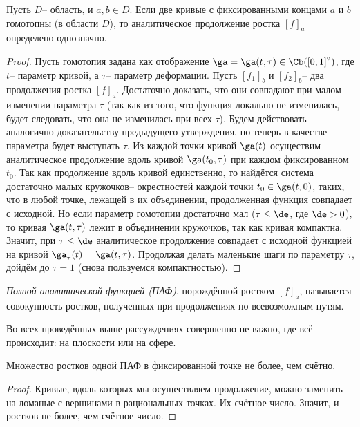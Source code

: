 \documentclass[a4paper]{article}
\begin{document}
\begin{theorem}[о монодромии]
Пусть $D$-- область, и $a,b\in D$. Если две кривые с фиксированными концами $a$ и $b$ гомотопны (в области $D$),
то аналитическое продолжение ростка $[f]_a$ определено однозначно.
\end{theorem}
\begin{proof}
Пусть гомотопия задана как отображение $\ga=\ga(t,\tau) \in \Cb([0,1]^2)$, где $t$-- параметр кривой, а $\tau$-- параметр
деформации. Пусть $[f_1]_b$ и $[f_2]_b$-- два продолжения ростка $[f]_a$. Достаточно доказать, что они совпадают при
малом изменении параметра $\tau$ (так как из того, что функция локально не изменилась, будет следовать, что она не изменилась
при всех $\tau$). Будем действовать аналогично доказательству предыдущего утверждения, но теперь в качестве
параметра будет выступать $\tau$. Из каждой точки кривой $\ga(t)$ осуществим аналитическое продолжение вдоль кривой $\ga(t_0,\tau)$
при каждом фиксированном $t_0$. Так как продолжение вдоль кривой единственно, то найдётся система достаточно малых кружочков--
окрестностей каждой точки $t_0\in\ga(t,0)$, таких, что в любой точке, лежащей в их объединении, продолженная функция совпадает
с исходной. Но если параметр гомотопии достаточно мал ($\tau \le \de$, где $\de>0$), то кривая $\ga(t,\tau)$ лежит в объединении
кружочков, так как кривая компактна. Значит, при $\tau\le\de$ аналитическое продолжение совпадает с исходной функцией
на кривой $\ga_\tau(t)= \ga(t,\tau)$. Продолжая делать маленькие шаги по параметру $\tau$, дойдём до $\tau=1$
(снова пользуемся компактностью).
\end{proof}

\begin{df}
\emph{Полной аналитической функцией (ПАФ)}, порождённой ростком  $[f]_a$, называется
совокупность ростков, полученных при продолжениях по всевозможным путям.
\end{df}

\begin{note}
Во всех проведённых выше рассуждениях совершенно не важно, где всё происходит: на плоскости или на сфере.
\end{note}

\begin{theorem}[Вольтерра]
Множество ростков одной ПАФ в фиксированной точке не более, чем счётно.
\end{theorem}
\begin{proof}
Кривые, вдоль которых мы осуществляем продолжение, можно заменить на ломаные с вершинами в рациональных точках.
Их счётное число. Значит, и ростков не более, чем счётное число.
\end{proof}
\end{document}
